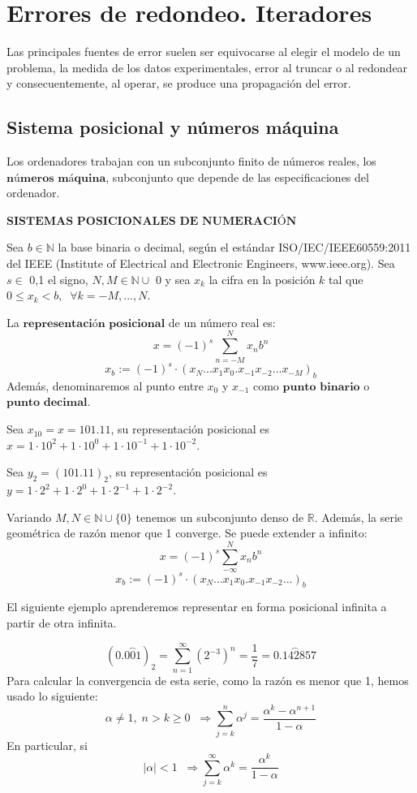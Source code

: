 \section{Errores de redondeo. Iteradores}
Las principales fuentes de error suelen ser equivocarse al elegir el modelo de un problema, la medida de los datos experimentales, error al truncar o al redondear y consecuentemente, al operar, se produce una propagación del error.

\subsection{Sistema posicional y números máquina}
Los ordenadores trabajan con un subconjunto finito de números reales, los $\textbf{números máquina}$, subconjunto que depende de las especificaciones del ordenador.

$\textbf{SISTEMAS POSICIONALES DE NUMERACIÓN}$

Sea $b \in \mathbb{N}$ la base binaria o decimal, según el estándar ISO/IEC/IEEE60559:2011 del IEEE (Institute of Electrical and Electronic Engineers, www.ieee.org). Sea $s \in$ {0,1} el signo, $N,M \in \mathbb{N} \cup$ {0} y sea $x_k$ la cifra en la posición $k$ tal que $0 \leq x_k < b, \; \; \forall k = -M, ..., N$.

La $\textbf{representación posicional}$ de un número real es:
\[ x = (-1)^s \sum_{n=-M}^N x_nb^n \]
\[ x_b := (-1)^s \cdot (x_N...x_1x_0.x_{-1}x_{-2}...x_{-M})_b \]
Además, denominaremos al punto entre $x_0$ y $x_{-1}$ como $\textbf{punto binario}$ o $\textbf{punto decimal}$.

\begin{ejemplo}
Sea $x_{10} = x = 101.11$, su representación posicional es $x = 1\cdot 10^2 + 1 \cdot 10^0 + 1 \cdot 10^{-1} + 1 \cdot 10^{-2}$.

Sea $y_2 = (101.11)_2$, su representación posicional es $y = 1 \cdot 2^2 + 1 \cdot 2^0 + 1 \cdot 2^{-1} + 1 \cdot 2^{-2}$.
\end{ejemplo}

Variando $M, N \in \mathbb{N} \cup \lbrace 0 \rbrace $ tenemos un subconjunto denso de $\mathbb{R}$. Además, la serie geométrica de razón menor que 1 converge. Se puede extender a infinito:
\[ x = (-1)^s \sum_{- \infty}^N x_nb^n \]
\[ x_b := (-1)^s \cdot (x_N...x_1x_0.x_{-1}x_{-2}...)_b \]

El siguiente ejemplo aprenderemos representar en forma posicional infinita a partir de otra infinita.

\begin{ejemplo}
\[ (0.\stackrel{ \frown}{001}) _2 = \sum_{n=1}^{\infty} \left( 2^{-3} \right) ^n = \frac{1}{7} = \stackrel{ \frown}{0.142857} \]
Para calcular la convergencia de esta serie, como la razón es menor que 1, hemos usado lo siguiente:
\[ \alpha \neq 1, \; n > k \geq 0 \; \; \Rightarrow \sum_{j=k}^n \alpha ^j = \frac{\alpha ^k - \alpha ^{n+1}}{1 - \alpha} \]
En particular, si \[ \vert \alpha \vert < 1 \; \; \Rightarrow  \sum_{j=k}^\infty \alpha ^k = \frac{\alpha ^k}{1 - \alpha} \]
\end{ejemplo}


